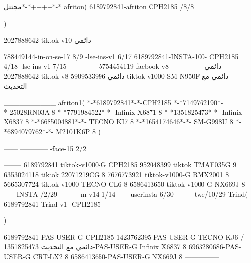 مجثثل*-*++++*-*
afriton(
6189792841-afriton CPH2185  /8/8

)

2027888642 tiktok-v10
دائمي

788449144-in-on-se-17 8/9
-lse-ins-v1 6/17
6189792841-INSTA-100- CPH2185 4/18
-lse-ins-v1 7/15
------------
5754454119 facbook-v8
دائمي
--------------
2027888642 tiktok-v8
دائمي
5909533996 tiktok-v1000  SM-N950F
دائمي مع التحديث

__________
afriton1(
*-*6189792841*-*-CPH2185
*-*7149762190*-*-25028RN03A  8
*-*7791984522*-*- Infinix X6871  8
*-*1351825473*-*-  Infinix X6837   8
*-*6685004881*-*- TECNO KI7   8
*-*1654174646*-*- SM-G998U   8
*-*6894079762*-*- M2101K6P   8
)


------
------------
-face-15 2/2

--------
6189792841 tiktok-v1000-G CPH2185 
952048399 tiktok TMAF035G 9
6353024118 tiktok 22071219CG 8
7676773921 tiktok-v1000-G RMX2001  8
5665307724 tiktok-v1000 TECNO CL6  8
6586413650 tiktok-v1000-G NX669J  8
-----
 INSTA /2/29
-------
-m-v14 1/14
-----
userinsta 6/30
------
-twe/10/29
Trind(
6189792841-Trind-v1- CPH2185 

)


6189792841-PAS-USER-G CPH2185 
1423762395-PAS-USER-G TECNO KJ6  /دائمي مع التحديث
1351825473-PAS-USER-G  Infinix X6837  8
6963280686-PAS-USER-G  CRT-LX2  8
6586413650-PAS-USER-G  NX669J  8
    ---------------
